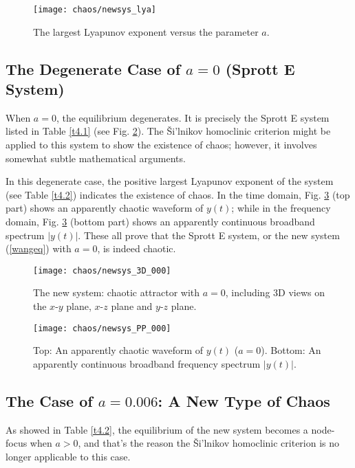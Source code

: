 \begin{figure}[h]
  \centering
  \texttt{[image: chaos/newsys\_lya]}
  \caption{\label{Lya}The largest Lyapunov exponent versus the
    parameter $a$.} 
\end{figure}

\subsection{The Degenerate Case of $a=0$ (Sprott E System)}

When $a=0$, the equilibrium degenerates. It is precisely the
Sprott E system listed in Table \ref{t4.1} (see Fig. \ref{0003D}). The
\v{S}i'lnikov homoclinic criterion might be applied to this system
to show the existence of chaos; however, it involves somewhat
subtle mathematical arguments.

In this degenerate case, the positive largest Lyapunov exponent of
the system (see Table \ref{t4.2}) indicates the existence of chaos.
In the time domain, Fig. \ref{000} (top part) shows an apparently
chaotic waveform of $y(t)$; while in the frequency domain, Fig.
\ref{000} (bottom part) shows an apparently continuous broadband
spectrum $|y(t)|$. These all prove that the Sprott E system, or
the new system (\ref{wangeq}) with $a=0$, is indeed chaotic.

\begin{figure}[h]
\centering
\texttt{[image: chaos/newsys\_3D\_000]}
 \caption{\label{0003D}The new system: chaotic attractor with
$a=0$, including 3D views on the $x$-$y$ plane, $x$-$z$ plane and
$y$-$z$ plane.} 
\end{figure}

\bigbreak

\begin{figure}[h]
\centering
\texttt{[image: chaos/newsys\_PP\_000]}
 \caption{\label{000}Top: An apparently chaotic waveform of
$y(t)$ ($a=0$). Bottom: An apparently continuous broadband
frequency spectrum $|y(t)|$.}
\end{figure}

\subsection{The Case of $a=0.006$: A New Type of Chaos}

As showed in Table \ref{t4.2}, the equilibrium of the new system
becomes a node-focus when $a>0$, and that's the reason the
\v{S}i'lnikov homoclinic criterion is no longer applicable to this case.


